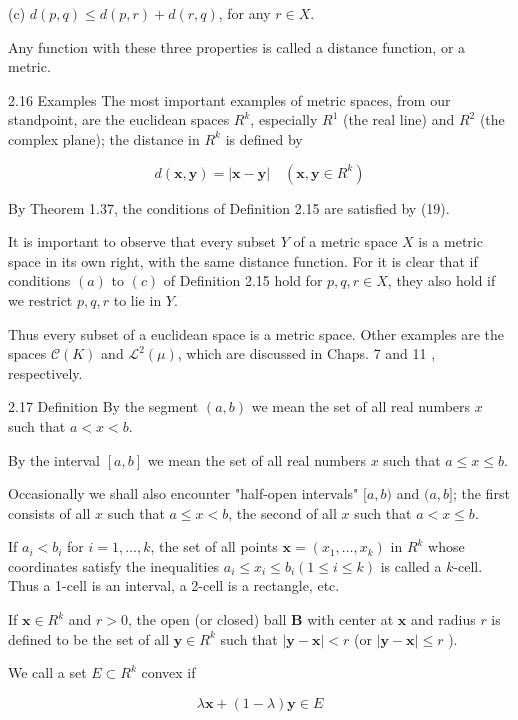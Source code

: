\documentclass[10pt]{article}
\begin{document}
(c) $d(p, q) \leq d(p, r)+d(r, q)$, for any $r \in X$.

Any function with these three properties is called a distance function, or a metric.

2.16 Examples The most important examples of metric spaces, from our standpoint, are the euclidean spaces $R^{k}$, especially $R^{1}$ (the real line) and $R^{2}$ (the complex plane); the distance in $R^{k}$ is defined by

$$
d(\mathbf{x}, \mathbf{y})=|\mathbf{x}-\mathbf{y}| \quad\left(\mathbf{x}, \mathbf{y} \in R^{k}\right)
$$

By Theorem 1.37, the conditions of Definition 2.15 are satisfied by (19).

It is important to observe that every subset $Y$ of a metric space $X$ is a metric space in its own right, with the same distance function. For it is clear that if conditions $(a)$ to $(c)$ of Definition 2.15 hold for $p, q, r \in X$, they also hold if we restrict $p, q, r$ to lie in $Y$.

Thus every subset of a euclidean space is a metric space. Other examples are the spaces $\mathscr{C}(K)$ and $\mathscr{L}^{2}(\mu)$, which are discussed in Chaps. 7 and 11 , respectively.

2.17 Definition By the segment $(a, b)$ we mean the set of all real numbers $x$ such that $a<x<b$.

By the interval $[a, b]$ we mean the set of all real numbers $x$ such that $a \leq x \leq b$.

Occasionally we shall also encounter "half-open intervals" $[a, b)$ and $(a, b]$; the first consists of all $x$ such that $a \leq x<b$, the second of all $x$ such that $a<x \leq b$.

If $a_{i}<b_{i}$ for $i=1, \ldots, k$, the set of all points $\mathbf{x}=\left(x_{1}, \ldots, x_{k}\right)$ in $R^{k}$ whose coordinates satisfy the inequalities $a_{i} \leq x_{i} \leq b_{i}(1 \leq i \leq k)$ is called a $k$-cell. Thus a 1-cell is an interval, a 2-cell is a rectangle, etc.

If $\mathbf{x} \in R^{k}$ and $r>0$, the open (or closed) ball $\boldsymbol{B}$ with center at $\mathbf{x}$ and radius $r$ is defined to be the set of all $\mathbf{y} \in R^{k}$ such that $|\mathbf{y}-\mathbf{x}|<r$ (or $|\mathbf{y}-\mathbf{x}| \leq r$ ).

We call a set $E \subset R^{k}$ convex if

$$
\lambda \mathbf{x}+(1-\lambda) \mathbf{y} \in E
$$
\end{document}
